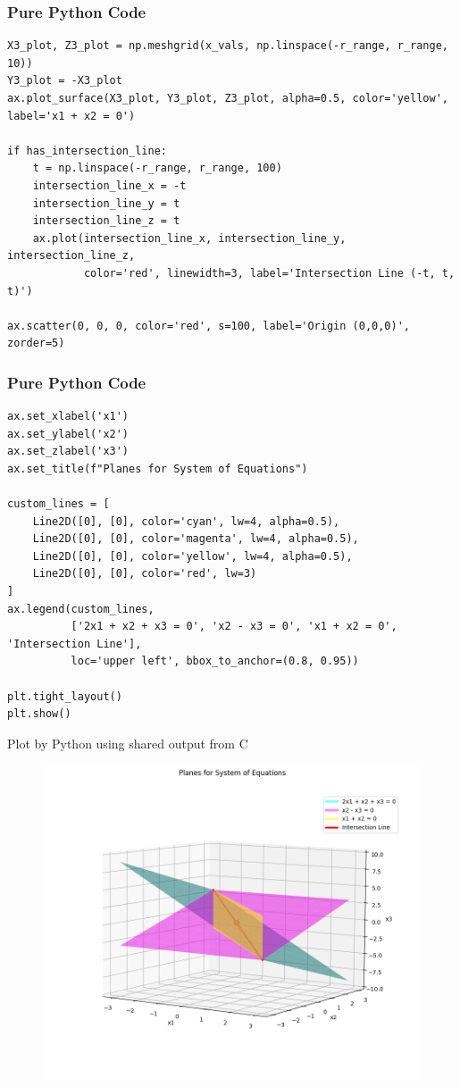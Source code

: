 \documentclass{beamer}
\begin{document}
\begin{frame}[fragile]
\frametitle{Pure Python Code}
\begin{lstlisting}
X3_plot, Z3_plot = np.meshgrid(x_vals, np.linspace(-r_range, r_range, 10))
Y3_plot = -X3_plot
ax.plot_surface(X3_plot, Y3_plot, Z3_plot, alpha=0.5, color='yellow', label='x1 + x2 = 0')

if has_intersection_line:
    t = np.linspace(-r_range, r_range, 100)
    intersection_line_x = -t
    intersection_line_y = t
    intersection_line_z = t
    ax.plot(intersection_line_x, intersection_line_y, intersection_line_z,
            color='red', linewidth=3, label='Intersection Line (-t, t, t)')

ax.scatter(0, 0, 0, color='red', s=100, label='Origin (0,0,0)', zorder=5)
\end{lstlisting}
\end{frame}

\begin{frame}[fragile]
\frametitle{Pure Python Code}
\begin{lstlisting}
ax.set_xlabel('x1')
ax.set_ylabel('x2')
ax.set_zlabel('x3')
ax.set_title(f"Planes for System of Equations")

custom_lines = [
    Line2D([0], [0], color='cyan', lw=4, alpha=0.5),
    Line2D([0], [0], color='magenta', lw=4, alpha=0.5),
    Line2D([0], [0], color='yellow', lw=4, alpha=0.5),
    Line2D([0], [0], color='red', lw=3)
]
ax.legend(custom_lines,
          ['2x1 + x2 + x3 = 0', 'x2 - x3 = 0', 'x1 + x2 = 0', 'Intersection Line'],
          loc='upper left', bbox_to_anchor=(0.8, 0.95))

plt.tight_layout()
plt.show()
\end{lstlisting}
\end{frame}

\begin{frame}{Plot by Python using shared output from C}
\begin{figure}[H]
        \centering
        \includegraphics[width=0.8\columnwidth]{../figs/fig1.png}
        \caption{}
        \label{fig:1}
    \end{figure}
\end{frame}
\end{document}
